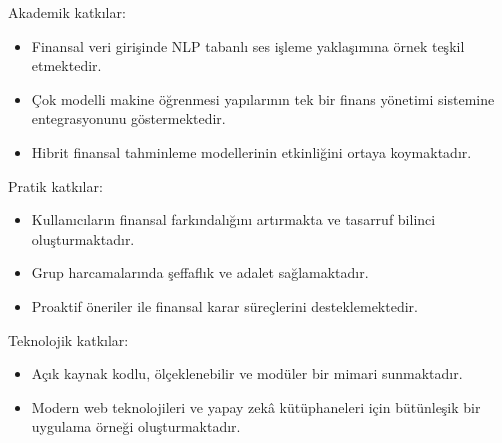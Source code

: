 Akademik katkılar:
\begin{itemize}
    \item Finansal veri girişinde NLP tabanlı ses işleme yaklaşımına örnek teşkil etmektedir.
    \item Çok modelli makine öğrenmesi yapılarının tek bir finans yönetimi sistemine entegrasyonunu göstermektedir.
    \item Hibrit finansal tahminleme modellerinin etkinliğini ortaya koymaktadır.
\end{itemize}

Pratik katkılar:
\begin{itemize}
    \item Kullanıcıların finansal farkındalığını artırmakta ve tasarruf bilinci oluşturmaktadır.
    \item Grup harcamalarında şeffaflık ve adalet sağlamaktadır.
    \item Proaktif öneriler ile finansal karar süreçlerini desteklemektedir.
\end{itemize}

Teknolojik katkılar:
\begin{itemize}
    \item Açık kaynak kodlu, ölçeklenebilir ve modüler bir mimari sunmaktadır.
    \item Modern web teknolojileri ve yapay zekâ kütüphaneleri için bütünleşik bir uygulama örneği oluşturmaktadır.
\end{itemize}

